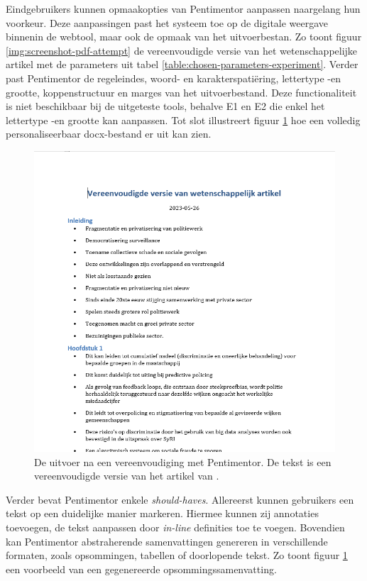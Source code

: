 \medspace

Eindgebruikers kunnen opmaakopties van Pentimentor aanpassen naargelang hun voorkeur. Deze aanpassingen past het systeem toe op de digitale weergave binnenin de webtool, maar ook de opmaak van het uitvoerbestan. Zo toont figuur \ref{img:screenshot-pdf-attempt} de vereenvoudigde versie van het wetenschappelijke artikel met de parameters uit tabel \ref{table:chosen-parameters-experiment}. Verder past Pentimentor de regeleindes, woord- en karakterspatiëring, lettertype -en grootte, koppenstructuur en marges van het uitvoerbestand. Deze functionaliteit is niet beschikbaar bij de uitgeteste tools, behalve E1 en E2 die enkel het lettertype -en grootte kan aanpassen. Tot slot illustreert figuur \ref{img:screenshot-docx-attempt} hoe een volledig personaliseerbaar docx-bestand er uit kan zien.

\begin{figure}[H]
	\includegraphics[width=\linewidth]{img/screenshot-prototype-word.png}
	\caption{De uitvoer na een vereenvoudiging met Pentimentor. De tekst is een vereenvoudigde versie van het artikel van \textcite{VanBrakel2022}.}
	\label{img:screenshot-docx-attempt}
\end{figure}

Verder bevat Pentimentor enkele \textit{should-haves}. Allereerst kunnen gebruikers een tekst op een duidelijke manier markeren. Hiermee kunnen zij annotaties toevoegen, de tekst aanpassen door \textit{in-line} definities toe te voegen. Bovendien kan Pentimentor abstraherende samenvattingen genereren in verschillende formaten, zoals opsommingen, tabellen of doorlopende tekst. Zo toont figuur \ref{img:screenshot-docx-attempt} een voorbeeld van een gegenereerde opsommingssamenvatting.

